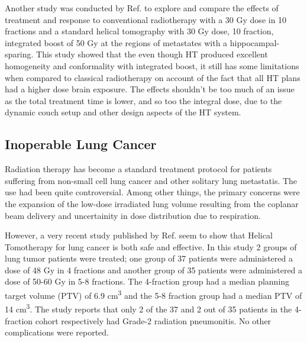 \documentclass[10pt,journal,compsoc]{IEEEtran} %
\begin{document}
  Another study was conducted by Ref. \cite{Hauswald2013} to explore 
  and 
  compare the 
  effects of treatment and response to conventional radiotherapy with 
  a 30 Gy 
  dose in 10 fractions and a standard helical tomography with 30 Gy 
  dose, 10 
  fraction, integrated boost of 50 Gy at the regions of metastates 
  with a 
  hippocampal-sparing. This study showed that the even though HT 
  produced 
  excellent homogeneity and conformality with integrated boost, it 
  still has 
  some limitations when compared to classical radiotherapy on account 
  of the 
  fact that all HT plans had a higher dose brain exposure. The 
  effects 
  shouldn't be too much of an issue as the total treatment time is 
  lower, and 
  so too the integral dose, due to the dynamic couch setup and other 
  design 
  aspects of the HT system.
  \subsection{Inoperable Lung Cancer}
  Radiation therapy has become a standard treatment protocol for 
  patients 
  suffering from non-small cell lung cancer and other solitary lung 
  metastatis. 
  The use had been quite controversial. Among other things, the 
  primary 
  concerns were the expansion of the low-dose irradiated lung volume 
  resulting 
  from the coplanar beam delivery and uncertainity in dose 
  distribution due to 
  respiration. 
  
  However, a very recent study published by Ref. \cite{Nagai2014} seem 
  to show 
  that Helical Tomotherapy for lung cancer is both safe and 
  effective. In this 
  study 2 groups of lung tumor patients were treated; one group of 37 
  patients 
  were administered a dose of 48 Gy in 4 fractions and another group 
  of 35 
  patients were administered a dose of 50-60 Gy in 5-8 fractions. The 
  4-fraction group had a median planning target volume (PTV) of 6.9 
  cm\textsuperscript{3} and the 5-8 fraction group had a median PTV 
  of 14 
  cm\textsuperscript{3}. The study reports that only 2 of the 37 and 
  2 out of 
  35 patients in the 4-fraction cohort respectively had Grade-2 
  radiation 
  pneumonitis. No other complications were reported.
  
\end{document}
